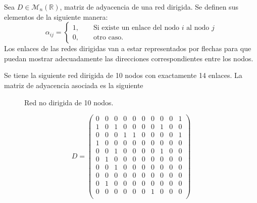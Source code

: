 \begin{definición}
	Sea $D\in\mathcal{M}_n(\mathbb{R})$, matriz de adyacencia de una red dirigida. Se definen sus elementos de la siguiente manera:
	$$
	\alpha_{ij}=\begin{cases}
		1,\qquad\text{Si existe un enlace del nodo $i$ al nodo $j$}\\
		0,\qquad\text{otro caso.}
	\end{cases}
	$$
	Los enlaces de las redes dirigidas van a estar representados por flechas para que puedan mostrar adecuadamente las direcciones correspondientes entre los nodos. 
\end{definición}

\begin{ejemplo}
	Se tiene la siguiente red dirigida de 10 nodos con exactamente 14 enlaces. La matriz de adyacencia asociada es la siguiente
\end{ejemplo}

\begin{figure} \vspace{-30pt} \begin{center}
		 
	\end{center} 
	\vspace{-20pt} 
	\caption{Red no dirigida de 10 nodos.} 
	\vspace{-150pt}
	\label{fig:Red10Dir}
\end{figure} 
$$
D = \begin{pmatrix}
	0 & 0 & 0 & 0 & 0 & 0 & 0 & 0 & 0 & 1 \\
	1 & 0 & 1 & 0 & 0 & 0 & 0 & 1 & 0 & 0 \\
	0 & 0 & 0 & 1 & 1 & 0 & 0 & 0 & 0 & 1 \\
	1 & 0 & 0 & 0 & 0 & 0 & 0 & 0 & 0 & 0 \\
	0 & 0 & 1 & 0 & 0 & 0 & 0 & 1 & 0 & 0 \\
	0 & 1 & 0 & 0 & 0 & 0 & 0 & 0 & 0 & 0 \\
	0 & 0 & 1 & 0 & 0 & 0 & 0 & 0 & 0 & 0 \\
	0 & 0 & 0 & 0 & 0 & 0 & 0 & 0 & 0 & 0 \\
	0 & 1 & 0 & 0 & 0 & 0 & 0 & 0 & 0 & 0 \\
	0 & 0 & 0 & 0 & 0 & 0 & 1 & 0 & 0 & 0 \\
\end{pmatrix}
$$

